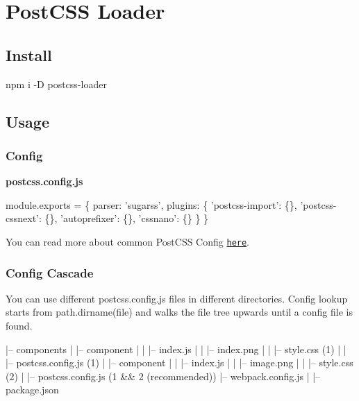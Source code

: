 \href{https://npmjs.com/package/postcss-loader}{\tt } \href{https://nodejs.org}{\tt } \href{https://david-dm.org/postcss/postcss-loader}{\tt } \href{https://travis-ci.org/postcss/postcss-loader}{\tt } \href{https://gitter.im/postcss/postcss}{\tt }

  \href{https://github.com/webpack/webpack}{\tt }  \href{https://evilmartians.com/?utm_source=postcss}{\tt }  \section*{Post\+C\+SS Loader}

 

\subsection*{Install}


\begin{DoxyCode}
npm i -D  postcss-loader
\end{DoxyCode}


\subsection*{Usage}

\subsubsection*{{\ttfamily Config}}

{\bfseries postcss.\+config.\+js} 
\begin{DoxyCode}
module.exports = \{
  parser: 'sugarss',
  plugins: \{
    'postcss-import': \{\},
    'postcss-cssnext': \{\},
    'autoprefixer': \{\},
    'cssnano': \{\}
  \}
\}
\end{DoxyCode}


You can read more about common Post\+C\+SS Config \href{https://github.com/michael-ciniawsky/postcss-load-config}{\tt here}.

\subsubsection*{{\ttfamily Config Cascade}}

You can use different {\ttfamily postcss.\+config.\+js} files in different directories. Config lookup starts from {\ttfamily path.\+dirname(file)} and walks the file tree upwards until a config file is found.


\begin{DoxyCode}
|– components
| |– component
| | |– index.js
| | |– index.png
| | |– style.css (1)
| | |– postcss.config.js (1)
| |– component
| | |– index.js
| | |– image.png
| | |– style.css (2)
|
|– postcss.config.js (1 && 2 (recommended))
|– webpack.config.js
|
|– package.json
\end{DoxyCode}



